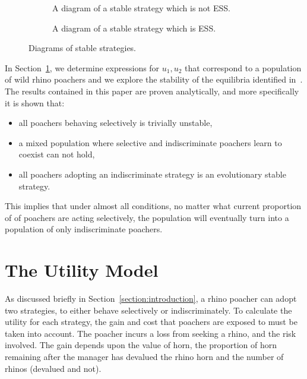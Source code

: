 \documentclass[10pt]{article}
\begin{document}
\begin{figure}[!htbp]
\begin{center}
    \begin{subfigure}{0.35\textwidth}
    
    \caption{\label{fig:stable_diagram} A diagram of a stable strategy which
    is not ESS.}
    \end{subfigure}
    \begin{subfigure}{0.35\textwidth}
    
    \caption{\label{fig:ess_diagram}A diagram of a stable strategy which is ESS.}
    \end{subfigure}
        \caption{\label{fig:stable_ess_driagrams} Diagrams of stable strategies.}
\end{center}
\end{figure}

In Section~\ref{section:the_model}, we determine expressions
for \(u_1, u_2\) that correspond to a population of wild rhino poachers and we
explore the stability of the equilibria identified in~\cite{Lee}. The results
contained in this paper are proven analytically, and more specifically it is
shown that:

\begin{itemize}
    \item all poachers behaving selectively is trivially unstable,
    \item a mixed population where selective and indiscriminate poachers
          learn to coexist can not hold,
    \item all poachers adopting an indiscriminate strategy is an evolutionary
          stable strategy.
\end{itemize}

This implies that under almost all conditions, no matter what current proportion
of
of poachers are acting selectively, the population will eventually turn into a
population of only indiscriminate poachers.

\section{The Utility Model}\label{section:the_model}

As discussed briefly in Section~\ref{section:introduction}, a rhino poacher
can adopt two strategies, to either behave selectively
or indiscriminately. To calculate the utility for each strategy, the gain and cost
that poachers are exposed to must be taken into account. The poacher incurs a
loss from seeking a rhino, and the risk involved. The gain depends upon the value
of horn, the proportion of horn remaining after the manager has devalued the
rhino horn and the number of rhinos (devalued and not).
\end{document}
